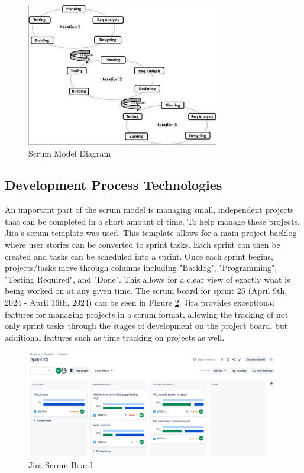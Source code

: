 \begin{figure}[htb]
    \centering
    \includegraphics[width=0.75\textwidth]{02_dev_process/res/sdlc_agile_model.jpg}
    \caption[Scrum Model Diagram]{Scrum Model Diagram \cite{tutorialspointAgile}}
    \label{fig:scrum_model}
\end{figure}

\subsection{Development Process Technologies}
An important part of the scrum model is managing small, independent projects that can be completed in a short amount of time. To help manage these projects, Jira's \cite{jira} scrum template was used. This template allows for a main project backlog where user stories can be converted to sprint tasks. Each sprint can then be created and tasks can be scheduled into a sprint. Once each sprint begins, projects/tasks move through columns including "Backlog", "Programming", "Testing Required", and "Done". This allows for a clear view of exactly what is being worked on at any given time. The scrum board for sprint 25 (April 9th, 2024 - April 16th, 2024) can be seen in Figure \ref{fig:jira_scrum_board}. Jira provides exceptional features for managing projects in a scrum format, allowing the tracking of not only sprint tasks through the stages of development on the project board, but additional features such as time tracking on projects as well.

\begin{figure}[htb]
    \centering
    \includegraphics[width=1\textwidth]{02_dev_process/res/jira_board_sprint_25.png}
    \caption[Jira Scrum Board]{Jira Scrum Board}
    \label{fig:jira_scrum_board}
\end{figure}

